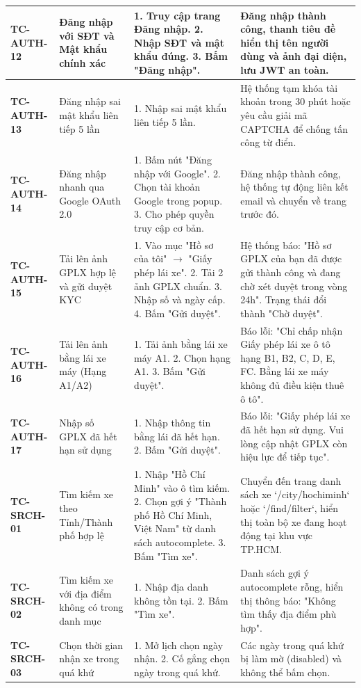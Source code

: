 {\begin{longtable}{p{2.3cm}p{3.8cm}p{4.8cm}p{4.2cm}}
\textbf{TC-AUTH-12} & Đăng nhập với SĐT và Mật khẩu chính xác & 1. Truy cập trang Đăng nhập. 2. Nhập SĐT và mật khẩu đúng. 3. Bấm "Đăng nhập". & Đăng nhập thành công, thanh tiêu đề hiển thị tên người dùng và ảnh đại diện, lưu JWT an toàn. \\ \midrule
\textbf{TC-AUTH-13} & Đăng nhập sai mật khẩu liên tiếp 5 lần & 1. Nhập sai mật khẩu liên tiếp 5 lần. & Hệ thống tạm khóa tài khoản trong 30 phút hoặc yêu cầu giải mã CAPTCHA để chống tấn công từ điển. \\ \midrule
\textbf{TC-AUTH-14} & Đăng nhập nhanh qua Google OAuth 2.0 & 1. Bấm nút "Đăng nhập với Google". 2. Chọn tài khoản Google trong popup. 3. Cho phép quyền truy cập cơ bản. & Đăng nhập thành công, hệ thống tự động liên kết email và chuyển về trang trước đó. \\ \midrule
\textbf{TC-AUTH-15} & Tải lên ảnh GPLX hợp lệ và gửi duyệt KYC & 1. Vào mục "Hồ sơ của tôi" $\to$ "Giấy phép lái xe". 2. Tải 2 ảnh GPLX chuẩn. 3. Nhập số và ngày cấp. 4. Bấm "Gửi duyệt". & Hệ thống báo: "Hồ sơ GPLX của bạn đã được gửi thành công và đang chờ xét duyệt trong vòng 24h". Trạng thái đổi thành "Chờ duyệt". \\ \midrule
\textbf{TC-AUTH-16} & Tải lên ảnh bằng lái xe máy (Hạng A1/A2) & 1. Tải ảnh bằng lái xe máy A1. 2. Chọn hạng A1. 3. Bấm "Gửi duyệt". & Báo lỗi: "Chỉ chấp nhận Giấy phép lái xe ô tô hạng B1, B2, C, D, E, FC. Bằng lái xe máy không đủ điều kiện thuê ô tô". \\ \midrule
\textbf{TC-AUTH-17} & Nhập số GPLX đã hết hạn sử dụng & 1. Nhập thông tin bằng lái đã hết hạn. 2. Bấm "Gửi duyệt". & Báo lỗi: "Giấy phép lái xe đã hết hạn sử dụng. Vui lòng cập nhật GPLX còn hiệu lực để tiếp tục". \\ \midrule
\textbf{TC-SRCH-01} & Tìm kiếm xe theo Tỉnh/Thành phố hợp lệ & 1. Nhập "Hồ Chí Minh" vào ô tìm kiếm. 2. Chọn gợi ý "Thành phố Hồ Chí Minh, Việt Nam" từ danh sách autocomplete. 3. Bấm "Tìm xe". & Chuyển đến trang danh sách xe `/city/hochiminh` hoặc `/find/filter`, hiển thị toàn bộ xe đang hoạt động tại khu vực TP.HCM. \\ \midrule
\textbf{TC-SRCH-02} & Tìm kiếm xe với địa điểm không có trong danh mục & 1. Nhập địa danh không tồn tại. 2. Bấm "Tìm xe". & Danh sách gợi ý autocomplete rỗng, hiển thị thông báo: "Không tìm thấy địa điểm phù hợp". \\ \midrule
\textbf{TC-SRCH-03} & Chọn thời gian nhận xe trong quá khứ & 1. Mở lịch chọn ngày nhận. 2. Cố gắng chọn ngày trong quá khứ. & Các ngày trong quá khứ bị làm mờ (disabled) và không thể bấm chọn. \\ \midrule

\end{longtable}}

